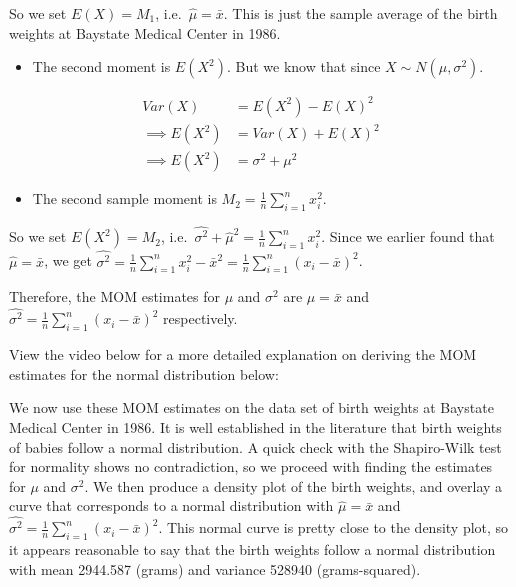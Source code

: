 \documentclass[
]{book}
\newenvironment{Shaded}{\begin{snugshade}}{\end{snugshade}}
\newcommand{\DocumentationTok}[1]{\textcolor[rgb]{0.56,0.35,0.01}{\textbf{\textit{#1}}}}
\newcommand{\FunctionTok}[1]{\textcolor[rgb]{0.13,0.29,0.53}{\textbf{#1}}}
\newcommand{\NormalTok}[1]{#1}
\newcommand{\OtherTok}[1]{\textcolor[rgb]{0.56,0.35,0.01}{#1}}
\newcommand{\SpecialCharTok}[1]{\textcolor[rgb]{0.81,0.36,0.00}{\textbf{#1}}}
\providecommand{\tightlist}{%
  \setlength{\itemsep}{0pt}\setlength{\parskip}{0pt}}
\begin{document}
So we set \(E(X) = M_1\), i.e.~\(\hat{\mu} = \bar{x}\). This is just the sample average of the birth weights at Baystate Medical Center in 1986.

\begin{itemize}
\tightlist
\item
  The second moment is \(E(X^2)\). But we know that since \(X \sim N(\mu, \sigma^2)\).
\end{itemize}

\[
\begin{split}
Var(X) &= E(X^2) - E(X)^2\\
\implies E(X^2) &= Var(X) + E(X)^2 \\
\implies E(X^2) &= \sigma^2 + \mu^2
\end{split}
\]

\begin{itemize}
\tightlist
\item
  The second sample moment is \(M_2 = \frac{1}{n} \sum_{i=1}^n x_i^2\).
\end{itemize}

So we set \(E(X^2) = M_2\), i.e.~\(\hat{\sigma^2} + \hat{\mu}^2 = \frac{1}{n} \sum_{i=1}^n x_i^2\). Since we earlier found that \(\hat{\mu} = \bar{x}\), we get \(\hat{\sigma^2} = \frac{1}{n} \sum_{i=1}^n x_i^2 - \bar{x}^2 = \frac{1}{n} \sum_{i=1}^n (x_i - \bar{x})^2\).

Therefore, the MOM estimates for \(\mu\) and \(\sigma^2\) are \(\hat{\mu} = \bar{x}\) and \(\hat{\sigma^2} = \frac{1}{n} \sum_{i=1}^n (x_i - \bar{x})^2\) respectively.

View the video below for a more detailed explanation on deriving the MOM estimates for the normal distribution below:

We now use these MOM estimates on the data set of birth weights at Baystate Medical Center in 1986. It is well established in the literature that birth weights of babies follow a normal distribution. A quick check with the Shapiro-Wilk test for normality shows no contradiction, so we proceed with finding the estimates for \(\mu\) and \(\sigma^2\). We then produce a density plot of the birth weights, and overlay a curve that corresponds to a normal distribution with \(\hat{\mu} = \bar{x}\) and \(\hat{\sigma^2} = \frac{1}{n} \sum_{i=1}^n (x_i - \bar{x})^2\). This normal curve is pretty close to the density plot, so it appears reasonable to say that the birth weights follow a normal distribution with mean 2944.587 (grams) and variance 528940 (grams-squared).

\begin{Shaded}
\end{Shaded}
\end{document}

